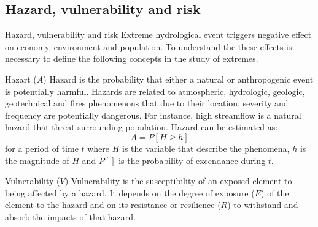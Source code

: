 \documentclass[8pt]{beamer}
\renewcommand{\emph}[1]{\textcolor{myorange}{#1}}
\begin{document}
\subsection{Hazard, vulnerability and risk}
\begin{frame}{Hazard, vulnerability and risk}
    Extreme hydrological event triggers  \emph{negative effect} on \emph{economy}, \emph{environment} and \emph{population}. To understand the these effects is necessary to define the following concepts in the study of extremes. 

    \begin{block}{Hazart ($A$)}
        \alert{Hazard} is the \emph{probability} that either a \emph{natural} or \emph{anthropogenic} event is \emph{potentially harmful}. \emph{Hazards} are related to atmospheric, hydrologic, geologic, geotechnical and fires phenomenons that due to their \emph{location}, \emph{severity} and \emph{frequency} are \emph{potentially dangerous}. For instance, \emph{high streamflow} is a \emph{natural hazard} that threat surrounding population. Hazard can be estimated as:
        \[
            A = P[H \geq h]
        \]
        for a period of time $t$ where $H$ is the variable that describe the phenomena, $h$ is the magnitude of $H$ and $P[]$ is the probability of excendance during $t$. 

    \end{block}
    \begin{block}{Vulnerability ($V$)}
        \alert{Vulnerability} is the \emph{susceptibility} of an \emph{exposed element} to being \emph{affected} by a \emph{hazard}. It depends on the \emph{degree of exposure ($E$)} of the element to the hazard and on its resistance or resilience ($R$) to withstand and absorb the impacts of that hazard.
    \end{block}

\end{frame}
\end{document}
